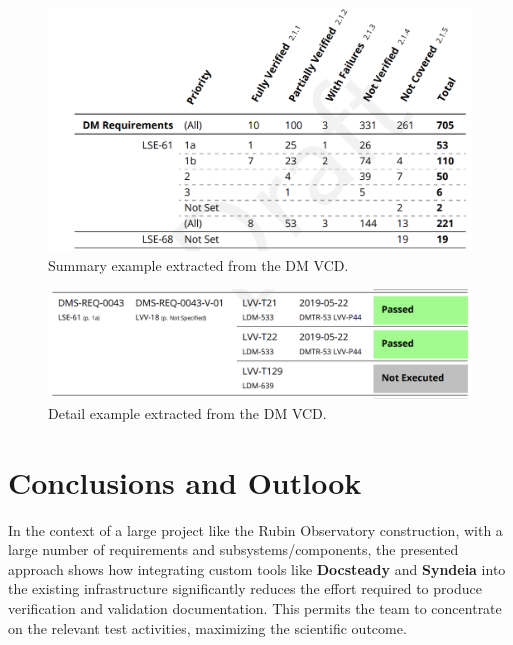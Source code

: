 \begin{figure}
\begin{center}
\includegraphics[width=\textwidth]{imgs/VCDsumm.png}
 \caption{Summary example extracted from the DM VCD.}
 \label{fig:vcdsum}
\end{center}
\end{figure}

\begin{figure}
\begin{center}
\includegraphics[width=\textwidth]{imgs/VCDdetail.png}
 \caption{Detail example extracted from the DM VCD.}
 \label{fig:vcddetail}
\end{center}
\end{figure}

\section{Conclusions and Outlook}

In the context of a large project like the Rubin Observatory construction, with a large number of requirements 
and subsystems/components, the presented approach shows how integrating custom tools like \textbf{Docsteady} 
and \textbf{Syndeia} into the existing infrastructure significantly reduces the effort
required to produce verification and validation documentation.
This permits the team to concentrate on the relevant test activities, maximizing the scientific outcome.

